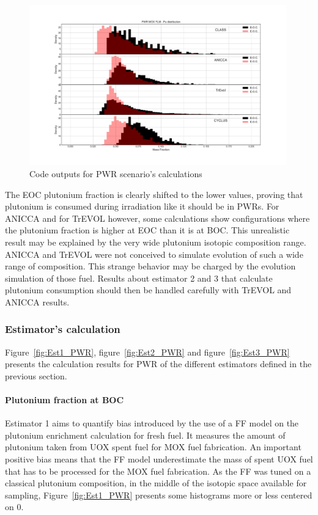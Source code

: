 \begin{figure}[h]
	\begin{center}
		\includegraphics[width = 0.99\textwidth]{../../Feature_1/RAW_DATA/FIG/PWR_MOX_FLM_Pu.pdf}
		\caption{Code outputs for PWR scenario's calculations}
		\label{fig:PWR_MOX_FLM_Pu}
	\end{center}
\end{figure}

The EOC plutonium fraction is clearly shifted to the lower values, proving that plutonium is consumed during irradiation like it should be in PWRs. For ANICCA and for TrEVOL however, some calculations show configurations where the plutonium fraction is higher at EOC than it is at BOC. This unrealistic result may be explained by the very wide plutonium isotopic composition range. ANICCA and TrEVOL were not conceived to simulate evolution of such a wide range of composition. This strange behavior may be charged by the evolution simulation of those fuel. Results about estimator 2 and 3 that calculate plutonium consumption should then be handled carefully with TrEVOL and ANICCA results.   

\subsubsection{Estimator's calculation}

Figure~\ref{fig:Est1_PWR}, figure~\ref{fig:Est2_PWR} and figure~\ref{fig:Est3_PWR} presents the calculation results for PWR of the different estimators defined in the previous section. 

\paragraph{Plutonium fraction at BOC}
Estimator 1 aims to quantify bias introduced by the use of a FF model on the plutonium enrichment calculation for fresh fuel. It measures the amount of plutonium taken from UOX spent fuel for MOX fuel fabrication. An important positive bias means that the FF model underestimate the mass of spent UOX fuel that has to be processed for the MOX fuel fabrication. As the FF was tuned on a classical plutonium composition, in the middle of the isotopic space available for sampling, Figure~\ref{fig:Est1_PWR} presents some histograms more or less centered on 0.

